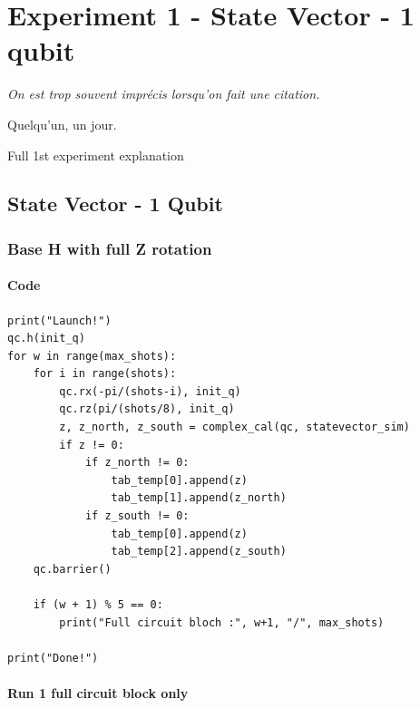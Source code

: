\chapter{Experiment 1 - State Vector - 1 qubit}

\epigraph{\textit{On est trop souvent imprécis lorsqu'on fait une citation.}}{Quelqu'un, un jour.}

Full 1st experiment explanation

\section{State Vector - 1 Qubit}
\subsection{Base H with full Z rotation}

\subsubsection{Code}
\begin{lstlisting}
print("Launch!")
qc.h(init_q)
for w in range(max_shots):
    for i in range(shots):
        qc.rx(-pi/(shots-i), init_q)
        qc.rz(pi/(shots/8), init_q)
        z, z_north, z_south = complex_cal(qc, statevector_sim)
        if z != 0:
            if z_north != 0:
                tab_temp[0].append(z)
                tab_temp[1].append(z_north)
            if z_south != 0:
                tab_temp[0].append(z)
                tab_temp[2].append(z_south)
    qc.barrier()
    
    if (w + 1) % 5 == 0:
        print("Full circuit bloch :", w+1, "/", max_shots)

print("Done!")
\end{lstlisting}

\subsubsection{Run 1 full circuit block only}

